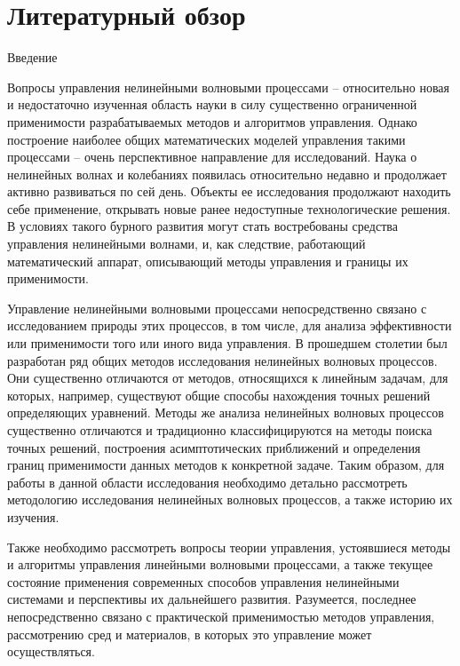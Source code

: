\chapter{Литературный обзор}


Введение

Вопросы управления нелинейными волновыми процессами – относительно новая и недостаточно изученная область науки в силу существенно ограниченной применимости разрабатываемых методов и алгоритмов управления. Однако построение наиболее общих математических моделей управления такими процессами – очень перспективное направление для исследований. Наука о нелинейных волнах и колебаниях появилась относительно недавно и продолжает активно развиваться по сей день. Объекты ее исследования продолжают находить себе применение, открывать новые ранее недоступные технологические решения. В условиях такого бурного развития могут стать востребованы средства управления нелинейными волнами, и, как следствие, работающий математический аппарат, описывающий методы управления и границы их применимости. 

Управление нелинейными волновыми процессами непосредственно связано с исследованием природы этих процессов, в том числе, для анализа эффективности или применимости того или иного вида управления. В прошедшем столетии был разработан ряд общих методов исследования нелинейных волновых процессов. Они существенно отличаются от методов, относящихся к линейным задачам, для которых, например, существуют общие способы нахождения точных решений определяющих уравнений. Методы же анализа нелинейных волновых процессов существенно отличаются и традиционно классифицируются на методы поиска точных решений, построения асимптотических приближений и определения границ применимости данных методов к конкретной задаче. Таким образом, для работы в данной области исследования необходимо детально рассмотреть методологию исследования нелинейных волновых процессов, а также историю их изучения.

Также необходимо рассмотреть вопросы теории управления, устоявшиеся методы и алгоритмы управления линейными волновыми процессами, а также текущее состояние применения современных способов управления нелинейными системами и перспективы их дальнейшего развития. Разумеется, последнее непосредственно связано с практической применимостью методов управления, рассмотрению сред и материалов, в которых это управление может осуществляться. 

